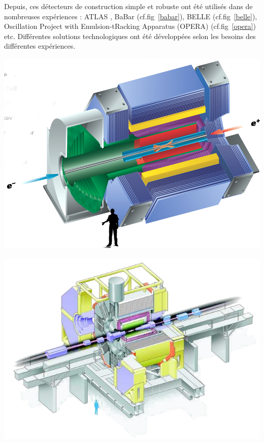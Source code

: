 Depuis, ces détecteurs de construction simple et robuste ont été utilisés dans de nombreuses expériences : ATLAS \cite{ATLAS}, BaBar \cite{Boutigny:1995ib} (cf.fig~\ref{babar}), BELLE \cite{ABASHIAN2002117} (cf.fig~\ref{belle}),  Oscillation Project with Emulsion-tRacking Apparatus (OPERA) \cite{1748-0221-9-10-C10003} (cf.fig~\ref{opera}) etc. Différentes solutions technologiques ont été développées selon les besoins des différentes expériences.

\marginpar
{
	\centering
	\includegraphics[width=\marginparwidth]{RPC/babar.png}
	\label{babar}
}

\marginpar
{
	\centering
	\includegraphics[width=\marginparwidth]{RPC/belle.png}
	\label{belle}
}


